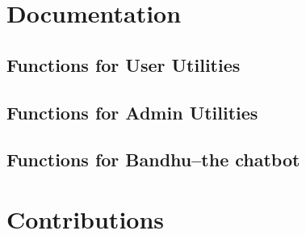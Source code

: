 \documentclass[a4paper]{scrartcl}
\begin{document}
\section{Documentation}
\subsection{Functions for User Utilities}
\subsection{Functions for Admin Utilities}
\subsection{Functions for Bandhu--the chatbot}
\section{Contributions}
\end{document}
